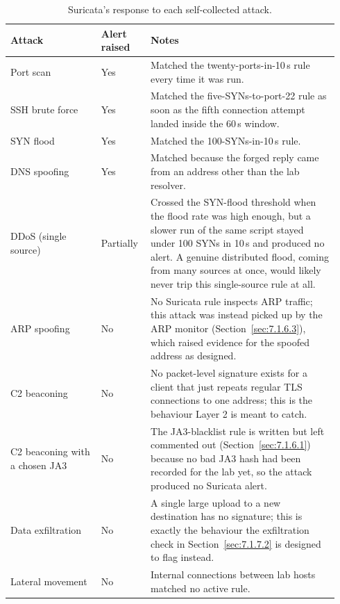 \begin{table}[H]
\centering
\caption{Suricata's response to each self-collected attack.}\label{tab:suricataresults}
\begin{tabular}{|>{\raggedright\arraybackslash}p{0.26\linewidth}|>{\raggedright\arraybackslash}p{0.14\linewidth}|>{\raggedright\arraybackslash}p{0.54\linewidth}|}
\hline
\textbf{Attack} & \textbf{Alert raised} & \textbf{Notes} \\ \hline
Port scan & Yes & Matched the twenty-ports-in-10\,s rule every time it was run. \\ \hline
SSH brute force & Yes & Matched the five-SYNs-to-port-22 rule as soon as the fifth connection attempt landed inside the 60\,s window. \\ \hline
SYN flood & Yes & Matched the 100-SYNs-in-10\,s rule. \\ \hline
DNS spoofing & Yes & Matched because the forged reply came from an address other than the lab resolver. \\ \hline
DDoS (single source) & Partially & Crossed the SYN-flood threshold when the flood rate was high enough, but a slower run of the same script stayed under 100 SYNs in 10\,s and produced no alert. A genuine distributed flood, coming from many sources at once, would likely never trip this single-source rule at all. \\ \hline
ARP spoofing & No & No Suricata rule inspects ARP traffic; this attack was instead picked up by the ARP monitor (Section~\ref{sec:7.1.6.3}), which raised evidence for the spoofed address as designed. \\ \hline
C2 beaconing & No & No packet-level signature exists for a client that just repeats regular TLS connections to one address; this is the behaviour Layer 2 is meant to catch. \\ \hline
C2 beaconing with a chosen JA3 & No & The JA3-blacklist rule is written but left commented out (Section~\ref{sec:7.1.6.1}) because no bad JA3 hash had been recorded for the lab yet, so the attack produced no Suricata alert. \\ \hline
Data exfiltration & No & A single large upload to a new destination has no signature; this is exactly the behaviour the exfiltration check in Section~\ref{sec:7.1.7.2} is designed to flag instead. \\ \hline
Lateral movement & No & Internal connections between lab hosts matched no active rule. \\ \hline
\end{tabular}
\end{table}


